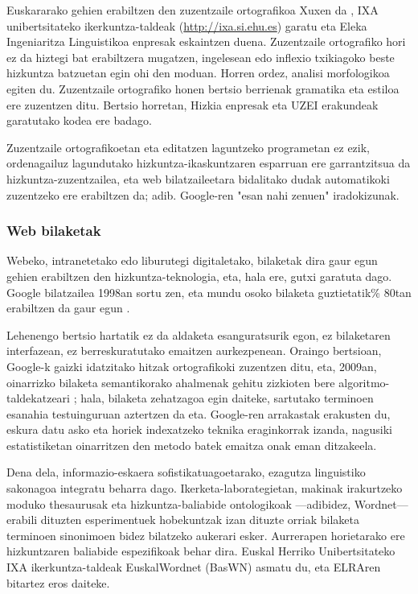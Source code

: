 \begin{multicols}{2}

Euskararako gehien erabiltzen den zuzentzaile ortografikoa Xuxen da \cite{BAS-Nota24}, IXA unibertsitateko ikerkuntza-taldeak (\url{http://ixa.si.ehu.es}) garatu eta Eleka Ingeniaritza Linguistikoa enpresak eskaintzen duena. Zuzentzaile ortografiko hori ez da hiztegi bat erabiltzera mugatzen, ingelesean edo inflexio txikiagoko beste hizkuntza batzuetan egin ohi den moduan. Horren ordez, analisi morfologikoa egiten du. Zuzentzaile ortografiko honen bertsio berrienak gramatika eta estiloa ere zuzentzen ditu. Bertsio horretan, Hizkia \cite{BAS-Nota25} enpresak eta UZEI \cite{BAS-Nota26}  erakundeak garatutako kodea ere badago. 

Zuzentzaile ortografikoetan eta editatzen laguntzeko programetan ez ezik, ordenagailuz lagundutako hizkuntza-ikaskuntzaren esparruan ere garrantzitsua da hizkuntza-zuzentzailea, eta web bilatzaileetara bidalitako dudak automatikoki zuzentzeko ere erabiltzen da; adib. Google-ren "esan nahi zenuen" iradokizunak. 

\subsubsection{Web bilaketak}
   Webeko, intranetetako edo liburutegi digitaletako, bilaketak dira gaur egun gehien erabiltzen den hizkuntza-teknologia, eta, hala ere, gutxi garatuta dago. Google bilatzailea 1998an sortu zen, eta mundu osoko bilaketa guztietatik\% 80tan erabiltzen da gaur egun \cite{BAS-Nota27}. 

Lehenengo bertsio hartatik ez da aldaketa esanguratsurik egon, ez bilaketaren interfazean, ez berreskuratutako emaitzen aurkezpenean. Oraingo bertsioan, Google-k gaizki idatzitako hitzak ortografikoki zuzentzen ditu, eta, 2009an, oinarrizko bilaketa semantikorako ahalmenak gehitu zizkioten bere algoritmo-taldekatzeari \cite{BAS-Nota28} ; hala, bilaketa zehatzagoa egin daiteke, sartutako terminoen esanahia testuinguruan aztertzen da eta. Google-ren arrakastak erakusten du, eskura datu asko eta horiek indexatzeko teknika eraginkorrak izanda, nagusiki estatistiketan oinarritzen den metodo batek emaitza onak eman ditzakeela. 

Dena dela, informazio-eskaera sofistikatuagoetarako, ezagutza linguistiko sakonagoa integratu beharra dago. Ikerketa-laborategietan, makinak irakurtzeko moduko thesaurusak eta hizkuntza-baliabide ontologikoak —adibidez, Wordnet— erabili dituzten esperimentuek hobekuntzak izan dituzte orriak bilaketa terminoen sinonimoen bidez bilatzeko aukerari esker. Aurrerapen horietarako ere hizkuntzaren baliabide espezifikoak behar dira. Euskal Herriko Unibertsitateko IXA ikerkuntza-taldeak EuskalWordnet (BasWN) asmatu du, eta ELRAren bitartez eros daiteke. 


\end{multicols}
